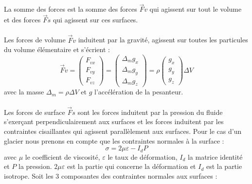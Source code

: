 \documentclass{article}
\begin{document}
\\\\
La somme des forces est la somme des forces $\vec{F}v$ qui agissent sur tout le volume et des forces $\vec{F}s$ qui agissent sur ces surfaces.
\\\\
Les forces de volume  $\vec{F}v$ induitent par la gravité, agissent sur toutes les particules du volume élémentaire et s'écrient :
\begin{equation}
\vec{F}v = 
\left(
\begin{array}{l}
F_{vx} \\
F_{vy} \\
F_{vz}
\end{array}
\right)
=
\left(
\begin{array}{l}
\Delta_{m} g_{x} \\
\Delta_{m} g_{y}  \\
\Delta_{m} g_{z} 
\end{array}
\right)
= \rho
\left(
\begin{array}{l}
g_{x} \\
g_{y}  \\
g_{z}
\end{array}
\right)
\Delta V
\end{equation}
 avec la masse $\Delta_{m} = \rho \Delta V$ et $g$ l'accélération de la pesanteur.
\\\\
Les forces de surface $\vec{F}s$ sont les forces induitent par la pression du fluide s'exerçant perpendiculairement aux surfaces et les forces induitent par les contraintes cisaillantes qui agissent parallèlement aux surfaces. Pour le cas d'un glacier nous prenons en compte que les contraintes normales à la surface : 
\begin{equation}
\sigma = 2 \mu \varepsilon - I_{d}P
\end{equation}
avec $\mu$ le coefficient de viscosité, $\varepsilon$ le taux de déformation, $I_{d}$ la matrice identité et $P$ la pression. $2\mu \varepsilon$ est la partie qui concerne la déformation et $I_{d}$ est la partie isotrope.\newline
Soit les 3 composantes des contraintes normales aux surfaces :
\end{document}
